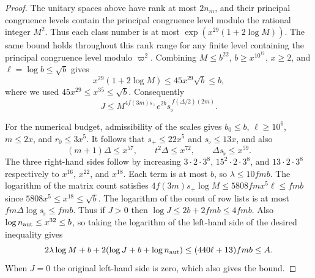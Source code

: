 \begin{proof}
The unitary spaces above have rank at most $2n_m$, and their principal congruence levels contain the principal congruence level modulo the rational integer $M^2$. Thus each class number is at most $\exp(x^{29}(1+2\log M))$. The same bound holds throughout this rank range for any finite level containing the principal congruence level modulo $\varpi^2$. Combining $M\le b^{22}$, $b\ge x^{10^{12}}$, $x\ge2$, and $\ell=\log b\le\sqrt b$ gives
\[
 x^{29}(1+2\log M)
 \le 45x^{29}\sqrt b\le b,
\]
where we used $45x^{29}\le x^{35}\le \sqrt b$. Consequently
\[
 J\le M^{4f(3m)s_+}e^{2b}s_\flat^{\,f(\Delta/2)(2m)} .
\]

For the numerical budget, admissibility of the scales gives $b_0\le b$, $\ell\ge10^6$, $m\le2x$, and $r_0\le3x^5$. It follows that $s_+\le22x^5$ and $s_\flat\le13x$, and also
\[
 (m+1)\Delta\le x^{57},\qquad
 t^2\Delta\le x^{72},\qquad
 \Delta s_\flat\le x^{59}.
\]
The three right-hand sides follow by increasing $3\cdot2\cdot3^8$, $15^2\cdot2\cdot3^8$, and $13\cdot2\cdot3^8$ respectively to $x^{16}$, $x^{22}$, and $x^{18}$. Each term is at most $b$, so $\lambda\le10fmb$. The logarithm of the matrix count satisfies $4f(3m)s_+\log M\le 5808fm x^5\ell\le fmb$ since $5808x^5\le x^{18}\le\sqrt b$. The logarithm of the count of row lists is at most $fm\Delta\log s_\flat\le fmb$. Thus if $J>0$ then $\log J\le2b+2fmb\le4fmb$. Also $\log n_{\rm aut}\le x^{32}\le b$, so taking the logarithm of the left-hand side of the desired inequality gives
\[
 2\lambda\log M+b+2(\log J+b+\log n_{\rm aut})
 \le (440\ell+13)fmb
 \le A .
\]
When $J=0$ the original left-hand side is zero, which also gives the bound.
\end{proof}

